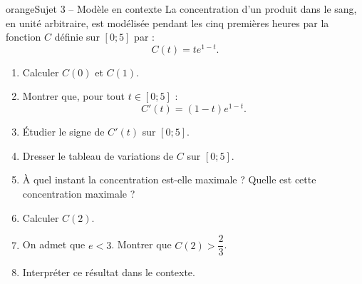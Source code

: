 \begin{exoBox}{orange}{Sujet 3 -- Modèle en contexte}
La concentration d'un produit dans le sang, en unité arbitraire, est modélisée pendant les cinq premières heures par la fonction $C$ définie sur $[0;5]$ par :
\[
C(t)=t e^{1-t}.
\]
\begin{enumerate}
\item Calculer $C(0)$ et $C(1)$.
\item Montrer que, pour tout $t\in[0;5]$ :
\[
C'(t)=(1-t)e^{1-t}.
\]
\item Étudier le signe de $C'(t)$ sur $[0;5]$.
\item Dresser le tableau de variations de $C$ sur $[0;5]$.
\item À quel instant la concentration est-elle maximale ? Quelle est cette concentration maximale ?
\item Calculer $C(2)$.
\item On admet que $e<3$. Montrer que $C(2)>\dfrac23$.
\item Interpréter ce résultat dans le contexte.
\end{enumerate}
\end{exoBox}
